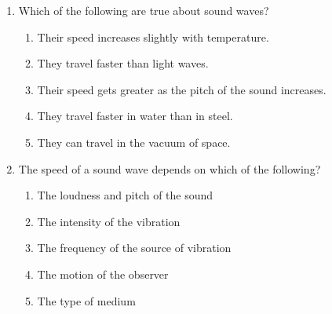 \documentclass{../../../oss-classkick}
\begin{document}
\begin{multicols}{2}
\begin{enumerate}[leftmargin=18pt,resume]
    
%    
    
  \item Which of the following are true about sound waves?
    \label{multi-1st}
    \begin{enumerate}[nosep,leftmargin=18pt,label=(\Alph*)]
    \item Their speed increases slightly with temperature.
    \item They travel faster than light waves.
    \item Their speed gets greater as the pitch of the sound increases.
    \item They travel faster in water than in steel.
    \item They can travel in the vacuum of space.
    \end{enumerate}
    \vspace{.7in}
    
    
  \item The speed of a sound wave depends on which of the following?
    \begin{enumerate}[nosep,leftmargin=18pt,label=(\Alph*)]
    \item The loudness and pitch of the sound
    \item The intensity of the vibration
    \item The frequency of the source of vibration
    \item The motion of the observer
    \item The type of medium
    \end{enumerate}


\end{enumerate}
\end{multicols}
\end{document}
